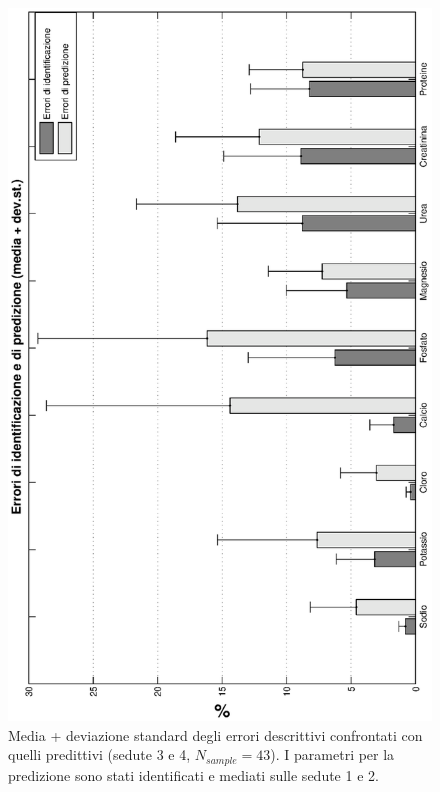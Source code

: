 \begin{figure}[!htb]
\centering
		\includegraphics[angle=-90, width=\textwidth]{immagini/desVSpred2.eps}
				\caption{Media + deviazione standard degli errori descrittivi confrontati con quelli predittivi (sedute 3 e 4, $N_{sample}=43$). I parametri per la predizione sono stati identificati e mediati sulle sedute 1 e 2.}\label{fig:desVSpred2}
\end{figure}

